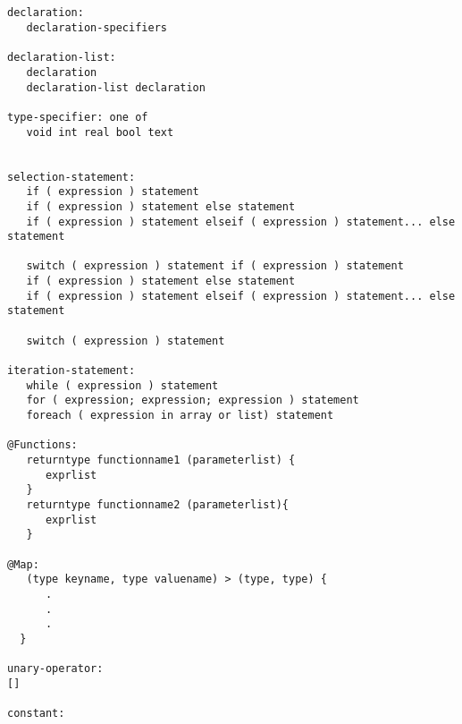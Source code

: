 \documentclass{book}
\begin{document}
\begin{verbatim}


declaration:
   declaration-specifiers

declaration-list:
   declaration
   declaration-list declaration

type-specifier: one of
   void int real bool text


selection-statement:
   if ( expression ) statement
   if ( expression ) statement else statement
   if ( expression ) statement elseif ( expression ) statement... else statement

   switch ( expression ) statement if ( expression ) statement
   if ( expression ) statement else statement
   if ( expression ) statement elseif ( expression ) statement... else statement
 
   switch ( expression ) statement

iteration-statement:  
   while ( expression ) statement
   for ( expression; expression; expression ) statement
   foreach ( expression in array or list) statement

@Functions:
   return­type function­name­1 (parameter­list) {
      exprlist 
   }
   returntype functionname2 (parameterlist){
      exprlist
   }

@Map: 
   (type key­name, type value­name) ­> (type, type) {
      .
      .
      .
  }

unary-operator:
[]

constant:

\end{verbatim}

\end{document}
